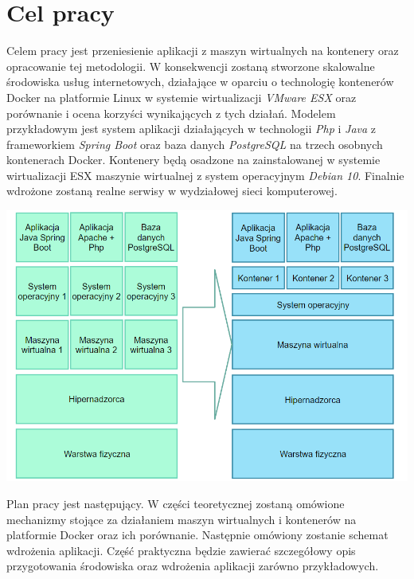 \documentclass[polish, a4paper, 12pt, oneside]{book}
\begin{document}
	\section{Cel pracy}
	Celem pracy jest przeniesienie aplikacji z maszyn wirtualnych na kontenery oraz opracowanie tej metodologii. W konsekwencji zostaną stworzone skalowalne środowiska usług internetowych, działające w oparciu o technologię kontenerów Docker na platformie Linux w systemie wirtualizacji \textit{VMware ESX}\cite{vmwareesx} oraz porównanie i ocena korzyści wynikających z tych działań. Modelem przykładowym jest system aplikacji działających w technologii \textit{Php}\cite{php} i \textit{Java}\cite{java} z frameworkiem \textit{Spring Boot}\cite{springboot} oraz baza danych \textit{PostgreSQL}\cite{postgresql} na trzech osobnych kontenerach Docker. Kontenery będą osadzone na zainstalowanej w systemie wirtualizacji ESX maszynie wirtualnej z system operacyjnym \textit{Debian 10}\cite{debian10}. Finalnie wdrożone zostaną realne serwisy w wydziałowej sieci komputerowej.\\
	\begin{center}
		\includegraphics[width=160mm]{schemat_proj.png}
	\end{center}
	
	Plan pracy jest następujący. W części teoretycznej zostaną omówione mechanizmy stojące za działaniem maszyn wirtualnych i kontenerów na platformie Docker oraz ich porównanie. Następnie omówiony zostanie schemat wdrożenia aplikacji. Część praktyczna będzie zawierać szczegółowy opis przygotowania środowiska oraz wdrożenia aplikacji zarówno przykładowych. 
	
\end{document}
